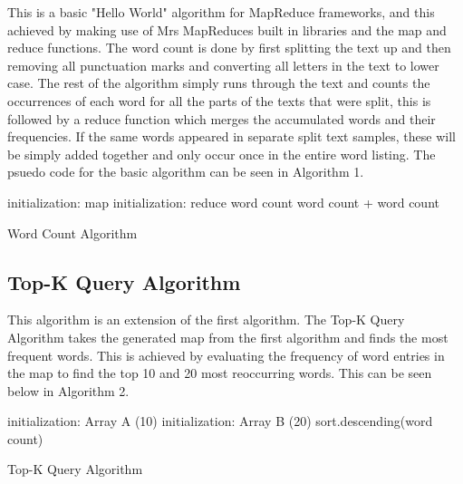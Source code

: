 \documentclass[twocolumn, 11pt]{IEEEtran}
\begin{document}
This is a basic "Hello World" algorithm for MapReduce frameworks, and this achieved by making use of Mrs MapReduces built in libraries and the map and reduce functions. The word count is done by first splitting the text up and then removing all punctuation marks and converting all letters in the text to lower case. The rest of the algorithm simply runs through the text and counts the occurrences of each word for all the parts of the texts that were split, this is followed by a reduce function which merges the accumulated words and their frequencies. If the same words appeared in separate split text samples, these will be simply added together and only occur once in the entire word listing. The psuedo code for the basic algorithm can be seen in Algorithm 1.   

\begin{algorithm}
\SetAlgoLined
     initialization: map\;
     initialization: reduce\;
     word count \leftarrow word count + word count\; 
     \caption{Word Count Algorithm}
\end{algorithm}


\subsection{Top-K Query Algorithm}

This algorithm is an extension of the first algorithm. The Top-K Query Algorithm takes the generated map from the first algorithm and finds the most frequent words. This is achieved by evaluating the frequency of word entries in the map to find the top 10 and 20 most reoccurring words. This can be seen below in Algorithm 2.

\begin{algorithm}
\SetAlgoLined
     initialization: Array A (10)\;
     initialization: Array B (20)\;
     sort.descending(word count)\:\\
     \caption{Top-K Query Algorithm}
\end{algorithm}
\end{document}
